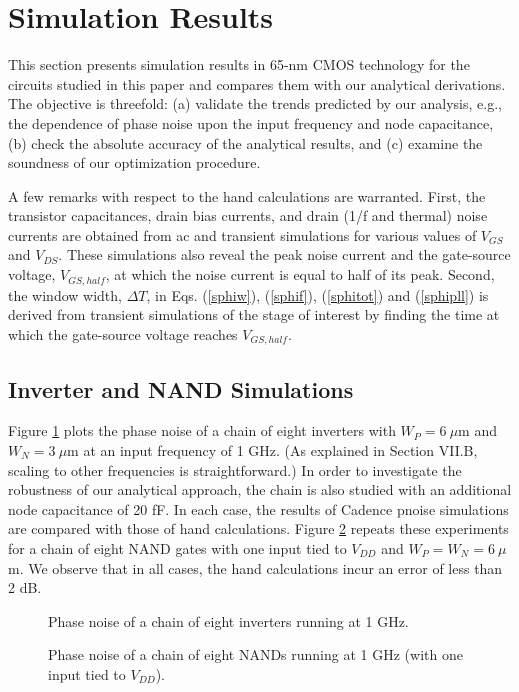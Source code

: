 \section{Simulation Results}
This section presents simulation results in 65-nm CMOS technology for the circuits studied in this paper and compares them with our
analytical derivations. The objective is threefold: (a) validate the trends
predicted by our analysis, e.g., the dependence of phase noise upon the input frequency and node capacitance, (b) check the absolute accuracy
of the analytical results, and (c) examine the soundness of our optimization procedure.

A few remarks with respect to the hand calculations are warranted. First, the transistor capacitances, drain bias currents, and drain (1/f and
thermal) noise currents are obtained from ac and transient simulations for various values of $V_{GS}$ and $V_{DS}$. These simulations also reveal the peak
noise current and the gate-source voltage, $V_{GS,half}$, at which the noise current is equal to half of its peak. Second, the window width,
$\Delta T$, in Eqs. (\ref{sphiw}), (\ref{sphif}), (\ref{sphitot}) and (\ref{sphipll}) is derived from transient simulations of the stage of interest by finding the time at
which the gate-source voltage reaches $V_{GS,half}$.

\subsection{Inverter and NAND Simulations}
Figure \ref{inverterchain} plots the phase noise of a chain of eight inverters with $W_P=6\ \mu$m and $W_N=3\ \mu$m at an input frequency of 1 GHz. (As
explained in Section VII.B, scaling to other frequencies is straightforward.) In
order to investigate the robustness of our analytical approach, the chain is also studied with an additional node capacitance of 20
fF. In each case, the results of Cadence pnoise simulations are compared with those of hand calculations. Figure \ref{nandchain} repeats these
experiments for a chain of eight NAND gates with one input tied to $V_{DD}$ and $W_P=W_N=6\ \mu$m. We observe
that in all cases, the hand calculations incur an error of less than 2 dB.
\begin{figure}[hbt]
\vspace{2.8in}
\caption{Phase noise of a chain of eight inverters running at 1 GHz.}
\label{inverterchain}
\end{figure} 
\begin{figure}[hbt]
\vspace{2.8in}
\caption{Phase noise of a chain of eight NANDs running at 1 GHz (with one input tied to $V_{DD}$).}
\label{nandchain}
\end{figure} 

